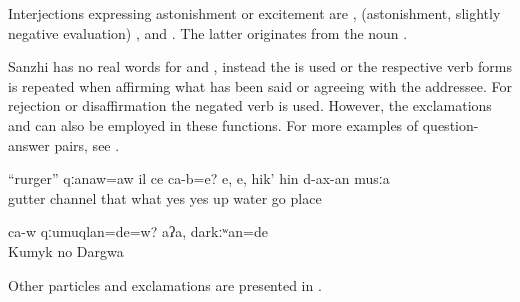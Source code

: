 Interjections expressing astonishment or excitement are  ,   (astonishment, slightly negative evaluation) , and   . The latter originates from the noun  .

Sanzhi has no real words for  and , instead the   is used or the respective verb forms is repeated when affirming what has been said or agreeing with the addressee. For rejection or disaffirmation the negated verb is used. However, the exclamations   and   can also be employed in these functions. For more examples of question-answer pairs, see .

\begin{exe}
	\ex	\label{ex:‎Gutter (ruger), this is a channel or what is it? Yes, the place where the water runs (to the water mill) minor}
	\gll	``rurger''	qːanaw=aw	il	ce	ca-b=e? e,	e,	hik'	hin	d-ax-an	musːa\\
		gutter	channel	that	what		yes	yes	up	water	go	place\\
	\glt	{}

	\ex	\label{ex:‎‎‎Was he himself Kumyk? ‎‎No, he was Dargi minor}
	\gll	ca-w	qːumuqlan=de=w?	aʔa,	darkːʷan=de\\
			Kumyk	no	Dargwa\\
	\glt	{}
\end{exe}

Other particles and exclamations are presented in .

